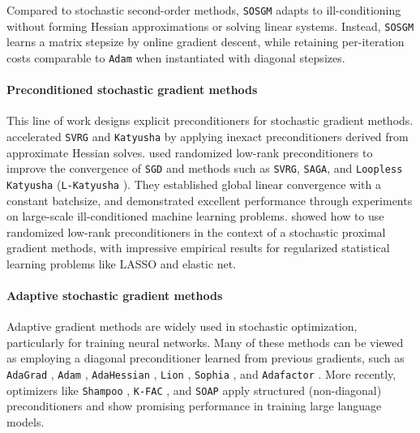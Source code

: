 \documentclass{article}
\theoremstyle{definition}
\newcommand{\sosgm}{\texttt{SOSGM}}
\newcommand{\svrg}{\texttt{SVRG}}
\newcommand{\saga}{\texttt{SAGA}}
\newcommand{\kat}{\texttt{L-Katyusha}}
\newcommand{\adam}{\texttt{Adam}}
\newcommand{\sgd}{\texttt{SGD}}
\begin{document}
Compared to stochastic second-order methods, {\sosgm} adapts to ill-conditioning without forming Hessian approximations or solving linear systems. Instead, {\sosgm} learns a matrix stepsize by online gradient descent, while retaining per-iteration costs comparable to {\adam} when instantiated with diagonal stepsizes.

\paragraph{Preconditioned stochastic gradient methods}
This line of work designs explicit preconditioners for stochastic gradient methods. 
\cite{liu2019acceleration} accelerated {\svrg} and \texttt{Katyusha} by applying inexact preconditioners derived from approximate Hessian solves. 
\cite{frangella2024sketchysgd, frangella2024promise} 
used randomized low-rank preconditioners to improve the convergence of {\sgd} and  methods such as {\svrg}, {\saga}, and \texttt{Loopless Katyusha} ({\kat} \cite{kovalev2020don}). 
They established global linear convergence with a constant batchsize,
and demonstrated excellent performance through experiments on large-scale ill-conditioned machine learning problems. 
\cite{sun2025sapphire} showed how to use randomized low-rank preconditioners in the context of a stochastic proximal gradient methods, with impressive empirical results for regularized statistical learning problems like LASSO and elastic net.

\paragraph{Adaptive stochastic gradient methods} 
Adaptive gradient methods are widely used in stochastic optimization, particularly for training neural networks. 
Many of these methods can be viewed as employing a diagonal preconditioner learned from previous gradients, 
such as \texttt{AdaGrad} \cite{duchi2011adaptive}, {\adam} \cite{kingma2014adam}, \texttt{AdaHessian} \cite{yao2021adahessian}, \texttt{Lion} \cite{chen2023symbolic}, \texttt{Sophia} \cite{liu2024sophia}, and \texttt{Adafactor} \cite{shazeer2018adafactor}. 
More recently, optimizers like \texttt{Shampoo} \cite{gupta2018shampoo}, \texttt{K-FAC} \cite{martens2015optimizing}, and \texttt{SOAP} \cite{vyas2025soap} apply structured (non-diagonal) preconditioners and show promising performance in training large language models.
\end{document}
